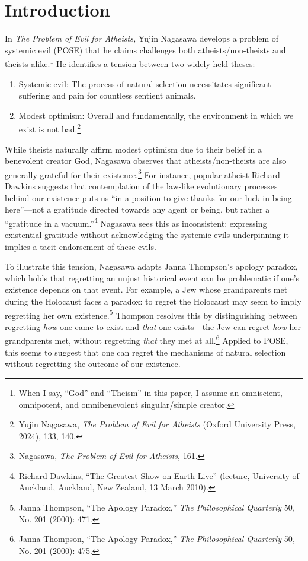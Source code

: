 \vspace{\credgap}

\section*{Introduction}

In \emph{The Problem of Evil for Atheists,} Yujin Nagasawa develops a
problem of systemic evil (POSE) that he claims challenges both
atheists/non-theists and theists alike.\footnote{When I say, ``God'' and
  ``Theism'' in this paper, I assume an omniscient, omnipotent, and
  omnibenevolent singular/simple creator.} He identifies a tension
between two widely held theses: 

\begin{enumerate}[leftmargin=42]
\def\labelenumi{(\arabic{enumi})}
\item
  Systemic evil: The process of natural selection necessitates
  significant suffering and pain for countless sentient animals.
\item
  Modest optimism: Overall and fundamentally, the environment in which
  we exist is not bad.\footnote{Yujin Nagasawa, \emph{The Problem of
    Evil for Atheists} (Oxford University Press, 2024), 133, 140.}
\end{enumerate}

\noindent While theists naturally affirm modest optimism due to their belief in a
benevolent creator God, Nagasawa observes that atheists/non-theists are
also generally grateful for their existence.\footnote{Nagasawa,
  \emph{The Problem of Evil for Atheists}, 161.} For instance, popular
atheist Richard Dawkins suggests that contemplation of the law-like
evolutionary processes behind our existence puts us ``in a position to
give thanks for our luck in being here''---not a gratitude directed
towards any agent or being, but rather a ``gratitude in a
vacuum.''\footnote{Richard Dawkins, ``The Greatest Show on Earth
  Live'' (lecture, University of Auckland, Auckland, New Zealand, 13
  March 2010).} Nagasawa sees this as inconsistent: expressing
existential gratitude without acknowledging the systemic evils
underpinning it implies a tacit endorsement of these evils.

To illustrate this tension, Nagasawa adapts Janna Thompson's apology
paradox, which holds that regretting an unjust historical event can be
problematic if one's existence depends on that event. For example, a Jew
whose grandparents met during the Holocaust faces a paradox: to regret
the Holocaust may seem to imply regretting her own existence.\footnote{Janna
  Thompson, ``The Apology Paradox,'' \emph{The Philosophical Quarterly}
  50\emph{,} No. 201 (2000): 471.} Thompson resolves this by
distinguishing between regretting \emph{how} one came to exist and
\emph{that} one exists---the Jew can regret \emph{how} her grandparents
met, without regretting \emph{that} they met at all.\footnote{Janna
  Thompson, ``The Apology Paradox,'' \emph{The Philosophical Quarterly}
  50\emph{,} No. 201 (2000): 475.} Applied to POSE, this seems to suggest that one can regret the
mechanisms of natural selection without regretting the outcome of our
existence.

